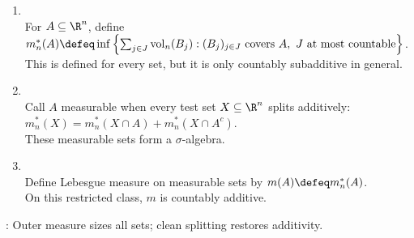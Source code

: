 \begin{method} \label{meth:lebesgue-measure-construction} 
\begin{enumerate}[label=(\roman*)]
\setlength{\itemsep}{0pt}
\item {}\\
For $A\subseteq\R^n$, define $m_n^\ast(A)\defeq\inf\left\{\sum_{j\in J}\operatorname{vol}_n(B_j):(B_j)_{j\in J}\text{ covers }A,\ J\text{ at most countable}\right\}$.\\
This is defined for every set, but it is only countably subadditive in general.
\item {}\\
Call $A$ measurable when every test set $X\subseteq\R^n$ splits additively: $m_n^\ast(X)=m_n^\ast(X\cap A)+m_n^\ast(X\cap A^c)$.\\
These measurable sets form a $\sigma$-algebra.
\item {}\\
Define Lebesgue measure on measurable sets by $m(A)\defeq m_n^\ast(A)$.\\
On this restricted class, $m$ is countably additive.
\end{enumerate}
: Outer measure sizes all sets; clean splitting restores additivity.
\end{method}

